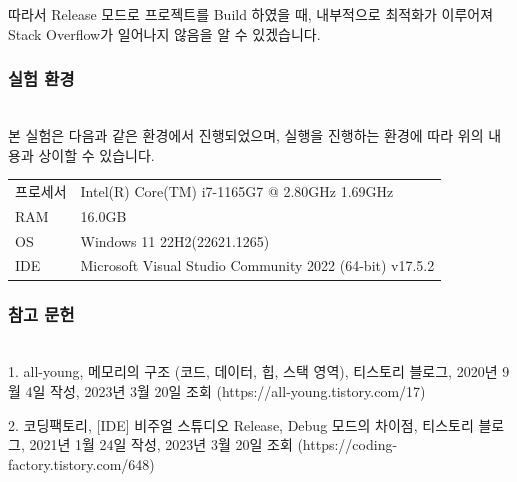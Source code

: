 따라서 Release 모드로 프로젝트를 Build 하였을 때, 내부적으로 최적화가 이루어져 Stack Overflow가 일어나지 않음을 알 수 있겠습니다.

\subsubsection{실험 환경}\phantom{}\\
본 실험은 다음과 같은 환경에서 진행되었으며, 실행을 진행하는 환경에 따라 위의 내용과 상이할 수 있습니다.

\begin{tabularx}{\textwidth}{l|X}
    \hline
    프로세서 & Intel(R) Core(TM) i7-1165G7 @ 2.80GHz  1.69GHz          \\
    RAM  & 16.0GB                                                  \\
    OS   & Windows 11 22H2(22621.1265)                             \\
    IDE  & Microsoft Visual Studio Community 2022 (64-bit) v17.5.2 \\
    \hline
\end{tabularx}

\subsubsection{참고 문헌}\phantom{}\\
1. all-young, 메모리의 구조 (코드, 데이터, 힙, 스택 영역), 티스토리 블로그, 2020년 9월 4일 작성, 2023년 3월 20일 조회 (https://all-young.tistory.com/17)

2. 코딩팩토리, {[IDE]} 비주얼 스튜디오 Release, Debug 모드의 차이점, 티스토리 블로그, 2021년 1월 24일 작성, 2023년 3월 20일 조회 (https://coding-factory.tistory.com/648)


